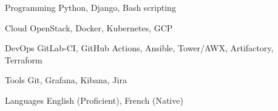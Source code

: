 

\begin{cvskills}

  \cvskill
    {Programming} %
    {Python, Django, Bash scripting} %

  \cvskill
    {Cloud} %
    {OpenStack, Docker, Kubernetes, GCP} %

  \cvskill
    {DevOps} %
    {GitLab-CI, GitHub Actions, Ansible, Tower/AWX, Artifactory, Terraform} %

  \cvskill
    {Tools} %
    {Git, Grafana, Kibana, Jira} %

  \cvskill
    {Languages} %
    {English (Proficient), French (Native)} %

\end{cvskills}